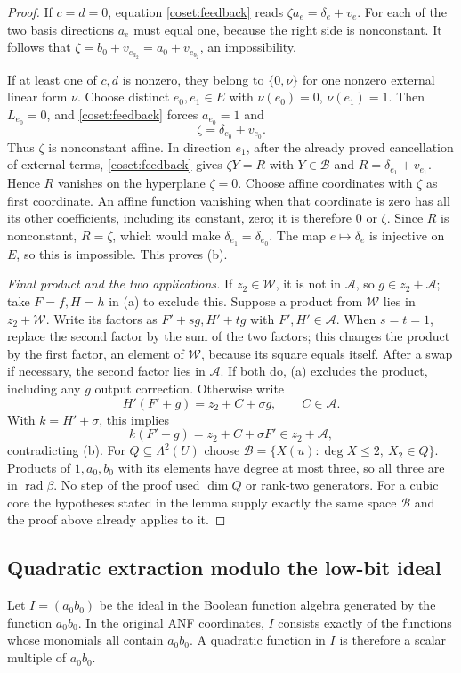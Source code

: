 \documentclass[11pt,a4paper]{article}
\theoremstyle{plain}
\theoremstyle{remark}
\newcommand{\rad}{\operatorname{rad}}
\begin{document}
\begin{proof}
If $c=d=0$, equation \eqref{coset:feedback} reads $\zeta a_e=\delta_e+v_e$. For each of the two basis directions $a_e$ must equal one, because the right side is nonconstant. It follows that $\zeta=b_0+v_{e_{a_2}}=a_0+v_{e_{b_2}}$, an impossibility.

If at least one of $c,d$ is nonzero, they belong to $\{0,\nu\}$ for one nonzero external linear form $\nu$. Choose distinct $e_0,e_1\in E$ with $\nu(e_0)=0$, $\nu(e_1)=1$. Then $L_{e_0}=0$, and \eqref{coset:feedback} forces $a_{e_0}=1$ and
\[
\zeta=\delta_{e_0}+v_{e_0}.
\]
Thus $\zeta$ is nonconstant affine. In direction $e_1$, after the already proved cancellation of external terms, \eqref{coset:feedback} gives $\zeta Y=R$ with $Y\in\mathcal B$ and $R=\delta_{e_1}+v_{e_1}$. Hence $R$ vanishes on the hyperplane $\zeta=0$. Choose affine coordinates with $\zeta$ as first coordinate. An affine function vanishing when that coordinate is zero has all its other coefficients, including its constant, zero; it is therefore $0$ or $\zeta$. Since $R$ is nonconstant, $R=\zeta$, which would make $\delta_{e_1}=\delta_{e_0}$. The map $e\mapsto\delta_e$ is injective on $E$, so this is impossible. This proves (b).

\emph{Final product and the two applications.} If $z_2\in\mathcal W$, it is not in $\mathcal A$, so $g\in z_2+\mathcal A$; take $F=f,H=h$ in (a) to exclude this. Suppose a product from $\mathcal W$ lies in $z_2+\mathcal W$. Write its factors as $F'+sg,H'+tg$ with $F',H'\in\mathcal A$. When $s=t=1$, replace the second factor by the sum of the two factors; this changes the product by the first factor, an element of $\mathcal W$, because its square equals itself. After a swap if necessary, the second factor lies in $\mathcal A$. If both do, (a) excludes the product, including any $g$ output correction. Otherwise write
\[
H'(F'+g)=z_2+C+\sigma g,\qquad C\in\mathcal A.
\]
With $k=H'+\sigma$, this implies
\[
k(F'+g)=z_2+C+\sigma F'\in z_2+\mathcal A,
\]
contradicting (b).
For $Q\subseteq\Lambda^2(U)$ choose $\mathcal B=\{X(u):\deg X\le2,\ X_2\in Q\}$. Products of $1,a_0,b_0$ with its elements have degree at most three, so all three are in $\rad\beta$. No step of the proof used $\dim Q$ or rank-two generators. For a cubic core the hypotheses stated in the lemma supply exactly the same space $\mathcal B$ and the proof above already applies to it.
\end{proof}

\subsection{Quadratic extraction modulo the low-bit ideal}
Let $I=(a_0b_0)$ be the ideal in the Boolean function algebra generated by the function $a_0b_0$. In the original ANF coordinates, $I$ consists exactly of the functions whose monomials all contain $a_0b_0$. A quadratic function in $I$ is therefore a scalar multiple of $a_0b_0$.
\end{document}
